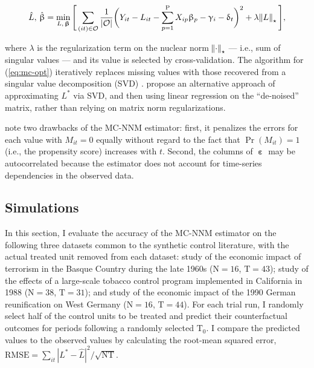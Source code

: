 \begin{equation}
\hat{L}, \, \hat{\upbeta} = \min_{L, \,\boldsymbol{\upbeta}} \Bigg[\sum_{(it) \in \mathcal{O}} \frac{1}{|\mathcal{O}|} \bigg(Y_{it} - L_{it} - \sum_{p=1}^{\text{P}} X_{ip} \upbeta_p - \upgamma_{i} - \updelta_{t} \bigg)^2 + \lambda \norm{L}_\star \Bigg], \label{eq:mc-opt}
\end{equation}

\noindent
where $\lambda$ is the regularization term on the nuclear norm $\norm{\cdot}_\star$ --- i.e., sum of singular values --- and its value is selected by cross-validation. The algorithm for (\ref{eq:mc-opt}) iteratively replaces missing values with those recovered from a singular value decomposition (SVD) \citep{mazumder2010spectral}. \citet{amjad2018robust} propose an alternative approach of approximating $L^{*}$ via SVD, and then using linear regression on the ``de-noised'' matrix, rather than relying on matrix norm regularizations.

\citet{athey2017matrix} note two drawbacks of the MC-NNM estimator: first, it penalizes the errors for each value with $M_{it} = 0$ equally without regard to the fact that $\Pr (M_{it}) = 1$ (i.e., the propensity score) increases with $t$. Second, the columns of $\boldsymbol{\upepsilon}$ may be autocorrelated because the estimator does not account for time-series dependencies in the observed data.

\subsection{Simulations} \label{sims}

In this section, I evaluate the accuracy of the MC-NNM estimator on the following three datasets common to the synthetic control literature, with the actual treated unit removed from each dataset:  study of the economic impact of terrorism in the Basque Country during the late 1960s ($\text{N}=16$, $\text{T}=43$);  study of the effects of a large-scale tobacco control program implemented in California in 1988 ($\text{N}=38$, $\text{T}=31$); and  study of the economic impact of the 1990 German reunification on West Germany ($\text{N}=16$, $\text{T}=44$). For each trial run, I randomly select half of the control units to be treated and predict their counterfactual outcomes for periods following a randomly selected $\text{T}_0$. I compare the predicted values to the observed values by calculating the root-mean squared error, $\text{RMSE} = \sum_{it}|L^{*} -\hat{L}|^2 / \sqrt{\text{NT}}$. 

